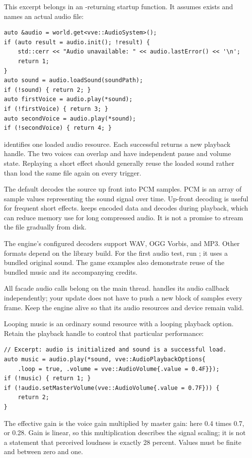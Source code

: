 \documentclass[11pt,a4paper]{article}
\begin{document}
This excerpt belongs in an -returning startup function. It assumes  exists and  names an actual audio file:
\begin{lstlisting}
auto &audio = world.get<vve::AudioSystem>();
if (auto result = audio.init(); !result) {
    std::cerr << "Audio unavailable: " << audio.lastError() << '\n';
    return 1;
}
auto sound = audio.loadSound(soundPath);
if (!sound) { return 2; }
auto firstVoice = audio.play(*sound);
if (!firstVoice) { return 3; }
auto secondVoice = audio.play(*sound);
if (!secondVoice) { return 4; }
\end{lstlisting}
 identifies one loaded audio resource. Each successful  returns a new playback handle. The two voices can overlap and have independent pause and volume state. Replaying a short effect should generally reuse the loaded sound rather than load the same file again on every trigger.

The default  decodes the source up front into PCM samples. PCM is an array of sample values representing the sound signal over time. Up-front decoding is useful for frequent short effects.  keeps encoded data and decodes during playback, which can reduce memory use for long compressed audio. It is not a promise to stream the file gradually from disk.

The engine's configured decoders support WAV, OGG Vorbis, and MP3. Other formats depend on the library build. For the first audio test, run ; it uses a bundled original sound. The game examples also demonstrate reuse of the bundled music and its accompanying credits.

All facade audio calls belong on the main thread.  handles its audio callback independently; your update does not have to push a new block of samples every frame. Keep the engine alive so that its audio resources and device remain valid.

Looping music is an ordinary sound resource with a looping playback option. Retain the playback handle to control that particular performance:
\begin{lstlisting}
// Excerpt: audio is initialized and sound is a successful load.
auto music = audio.play(*sound, vve::AudioPlaybackOptions{
    .loop = true, .volume = vve::AudioVolume{.value = 0.4F}});
if (!music) { return 1; }
if (!audio.setMasterVolume(vve::AudioVolume{.value = 0.7F})) {
    return 2;
}
\end{lstlisting}
The effective gain is the voice gain multiplied by master gain: here 0.4 times 0.7, or 0.28. Gain is linear, so this multiplication describes the signal scaling; it is not a statement that perceived loudness is exactly 28 percent. Values must be finite and between zero and one.
\end{document}
